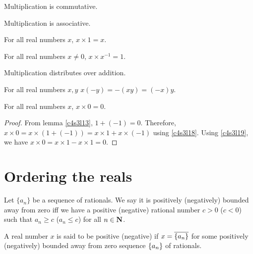 \begin{lem}\label{c4s3l14}
Multiplication is commutative.
\end{lem}

\begin{lem}\label{c4s3l15}
Multiplication is associative.
\end{lem}

\begin{lem}\label{c4s3l16}
For all real numbers $x$, $x \times 1 = x$.
\end{lem}

\begin{lem}\label{c4s3l17}
For all real numbers $x \ne 0$, $x \times x^{-1} = 1$.
\end{lem}

\begin{lem}\label{c4s3l18}
Multiplication distributes over addition.
\end{lem}

\begin{lem}\label{c4s3l19}
For all real numbers $x, y$ $x(-y) = -(xy) = (-x)y$.
\end{lem}

\begin{lem}\label{c4s3l20}
For all real numbers $x$, $x \times 0 = 0$.
\end{lem}
\begin{proof}
From lemma \ref{c4s3l13}, $1 + (-1) = 0$. Therefore, $x \times 0 =
x \times (1 + (-1)) = x \times 1 + x \times (-1)$ using \ref{c4s3l18}.
Using \ref{c4s3l19}, we have $x \times 0 = x \times 1 - x \times 1 = 0$.
\end{proof}

\section{Ordering the reals}\label{c4s4}
\begin{defn}\label{c4s4d1}
Let $\{a_n\}$ be a sequence of rationals. We say it is positively 
(negatively) bounded away from zero iff we have a positive (negative)
rational number $c > 0$ ($c < 0$) such that $a_n \ge c$ ($a_n \le c$)
for all $n \in \mathbf{N}$.
\end{defn}

\begin{defn}\label{c4s4d2}
A real number $x$ is said to be positive (negative) if $x = 
\overline{\{a_n\}}$ for some positively (negatively) bounded away from
zero sequence $\{a_n\}$ of rationals.
\end{defn}

